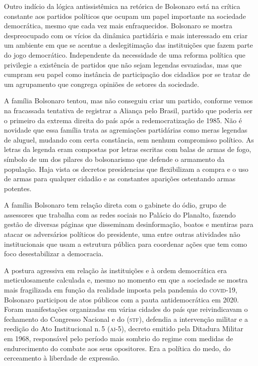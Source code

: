 Outro indício da lógica antissistêmica na retórica de Bolsonaro está na
crítica constante aos partidos políticos que ocupam um papel importante
na sociedade democrática, mesmo que cada vez mais enfraquecidos.
Bolsonaro se mostra despreocupado com os vícios da dinâmica partidária e
mais interessado em criar um ambiente em que se acentue a deslegitimação
das instituições que fazem parte do jogo democrático. Independente da
necessidade de uma reforma política que privilegie a existência de
partidos que não sejam legendas esvaziadas, mas que cumpram seu papel
como instância de participação dos cidadãos por se tratar de um
agrupamento que congrega opiniões de setores da sociedade.

A família Bolsonaro tentou, mas não conseguiu criar um partido, conforme
vemos na fracassada tentativa de registrar a Aliança pelo Brasil,
partido que poderia ser o primeiro da extrema direita do país após a
redemocratização de 1985. Não é novidade que essa família trata as
agremiações partidárias como meras legendas de aluguel, mudando com
certa constância, sem nenhum compromisso político. As letras da legenda
eram compostas por letras escritas com balas de armas de fogo, símbolo
de um dos pilares do bolsonarismo que defende o armamento da população.
Haja vista os decretos presidencias que flexibilizam a compra e o uso de
armas para qualquer cidadão e as constantes aparições ostentando armas
potentes.

A família Bolsonaro tem relação direta com o gabinete do ódio, grupo de
assessores que trabalha com as redes sociais no Palácio do Planalto,
fazendo gestão de diversas páginas que disseminam desinformação, boatos
e mentiras para atacar os adversários políticos do presidente, uma entre
outras atividades não institucionais que usam a estrutura pública para
coordenar ações que tem como foco desestabilizar a democracia.

A postura agressiva em relação às instituições e à ordem democrática era
meticulosamente calculada e, mesmo no momento em que a sociedade se
mostra mais fragilizada em função da realidade imposta pela pandemia do
\textsc{covid-19}, Bolsonaro participou de atos públicos com a pauta
antidemocrática em 2020. Foram manifestações organizadas em várias
cidades do país que reivindicavam o fechamento do Congresso Nacional e
do (\textsc{stf}), defendia a intervenção militar e a
reedição do Ato Institucional n.\,5 (\textsc{ai-5}), decreto emitido pela Ditadura
Militar em 1968, responsável pelo período mais sombrio do regime com
medidas de endurecimento do combate aos seus opositores. Era a política
do medo, do cerceamento à liberdade de expressão.

